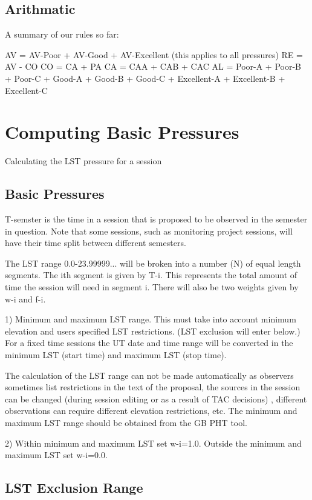 \documentclass{article}
\begin{document}
\subsection{Arithmatic}

A summary of our rules so far:

AV = AV-Poor + AV-Good + AV-Excellent (this applies to all pressures)
RE = AV - CO
CO = CA + PA
CA = CAA + CAB + CAC
AL = Poor-A + Poor-B + Poor-C + Good-A + Good-B + Good-C + Excellent-A + Excellent-B + Excellent-C 

\section{Computing Basic Pressures}

Calculating the LST pressure for a session

\subsection{Basic Pressures}


T-semster is the time in a session that is proposed to be observed in the semester in question. Note that some sessions, such as monitoring project sessions, will have their time split between different semesters.

The LST range 0.0-23.99999... will be broken into a number (N) of equal length segments. The ith segment is given by T-i. This represents the total amount of time the session will need in segment i. There will also be two weights given by w-i and f-i.

1) Minimum and maximum LST range. This must take into account minimum elevation and users specified LST restrictions. (LST exclusion will enter below.) For a fixed time sessions the UT date and time range will be converted in the minimum LST (start time) and maximum LST (stop time).

The calculation of the LST range can not be made automatically as observers sometimes list restrictions in the text of the proposal, the sources in the session can be changed (during session editing or as a result of TAC decisions) , different observations can require different elevation restrictions, etc. The minimum and maximum LST range should be obtained from the GB PHT tool.

2) Within minimum and maximum LST set w-i=1.0. Outside the minimum and maximum LST set w-i=0.0. 

\subsection{LST Exclusion Range}
\end{document}
